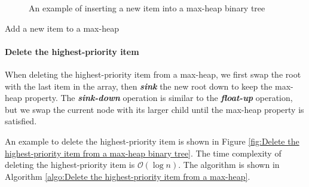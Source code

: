 \documentclass[12pt,a4paper]{ctexart}
\newcommand{\highlight}[1]{\textbf{\textit{#1}}}
\begin{document}
\begin{figure}[!htbp]
\begin{minipage}{0.5\textwidth}
        \end{minipage}
        \caption{An example of inserting a new item into a max-heap binary tree}
        \label{fig:Insert a new item into a max-heap binary tree}
    \end{figure}

    \begin{algorithm}[!htbp]
        \caption{Add a new item to a max-heap}
        \label{algo:Add a new item to a max-heap}
        \BlankLine
    \end{algorithm}

    \paragraph{Delete the highest-priority item}

    When deleting the highest-priority item from a max-heap, we first swap the root with the last item in the array, then \highlight{sink} the new root down to keep the max-heap property. The \highlight{sink-down} operation is similar to the \highlight{float-up} operation, but we swap the current node with its larger child until the max-heap property is satisfied.
    
    An example to delete the highest-priority item is shown in Figure \ref{fig:Delete the highest-priority item from a max-heap binary tree}. The time complexity of deleting the highest-priority item is $\mathcal O(\log n)$. The algorithm is shown in Algorithm \ref{algo:Delete the highest-priority item from a max-heap}.
\end{document}
